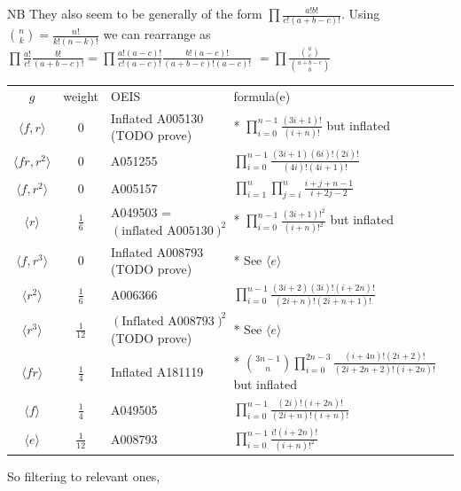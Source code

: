 \documentclass[11pt,a4paper]{article}
\theoremstyle{remark}
\begin{document}
NB They also seem to be generally of the form $\prod \frac{a! b!}{c! (a+b-c)!}$. Using $\binom{n}{k} = \frac{n!}{k!(n-k)!}$ we can rearrange as
$\prod \frac{a!}{c!} \frac{b!}{(a+b-c)!} = \prod \frac{a!(a-c)!}{c!(a-c)!} \frac{b!(a-c)!}{(a+b-c)!(a-c)!}$
$ = \prod \frac{\binom{a}{c}}{\binom{a+b-c}{b}} $

\begin{tabular}{ccll}
$g$                     & weight & OEIS & formula(e) \\
$\langle f,r\rangle$    & $0$      & Inflated A005130 (TODO prove) & * $\prod_{i=0}^{n-1} \frac{(3i+1)!}{(i+n)!}$ but inflated \\
$\langle fr,r^2\rangle$ & $0$      & A051255 & $\prod_{i=0}^{n-1} \frac{(3i+1)(6i)!(2i)!}{(4i)!(4i+1)!}$ \\
$\langle f,r^2\rangle$  & $0$      & A005157 & $\prod_{i=1}^n \prod_{j=i}^n \frac{i+j+n-1}{i+2j-2}$ \\
$\langle r\rangle$      & $\frac16$    & A049503 = $(\textrm{inflated A005130})^2$ & * $\prod_{i=0}^{n-1} \frac{(3i+1)!^2}{(i+n)!^2}$ but inflated \\
$\langle f,r^3\rangle$  & $0$      & Inflated A008793 (TODO prove) & * See $\langle e\rangle$ \\
$\langle r^2\rangle$    & $\frac16$    & A006366 & $\prod_{i=0}^{n-1} \frac{(3i+2)(3i)!(i+2n)!}{(2i+n)!(2i+n+1)!}$ \\
$\langle r^3\rangle$    & $\frac1{12}$   & $(\textrm{Inflated A008793})^2$ (TODO prove) & * See $\langle e\rangle$ \\
$\langle fr\rangle$     & $\frac14$    & Inflated A181119 & * $\binom{3n-1}{n} \prod_{i=0}^{2n-3} \frac{(i+4n)!(2i+2)!}{(2i+2n+2)!(i+2n)!}$ but inflated \\
$\langle f\rangle$      & $\frac14$    & A049505 & $\prod_{i=0}^{n-1} \frac{(2i)!(i+2n)!}{(2i+n)!(i+n)!}$ \\
$\langle e\rangle$      & $\frac1{12}$   & A008793 & $\prod_{i=0}^{n-1} \frac{i!(i+2n)!}{(i+n)!^2}$
\end{tabular}

So filtering to relevant ones,
\end{document}

